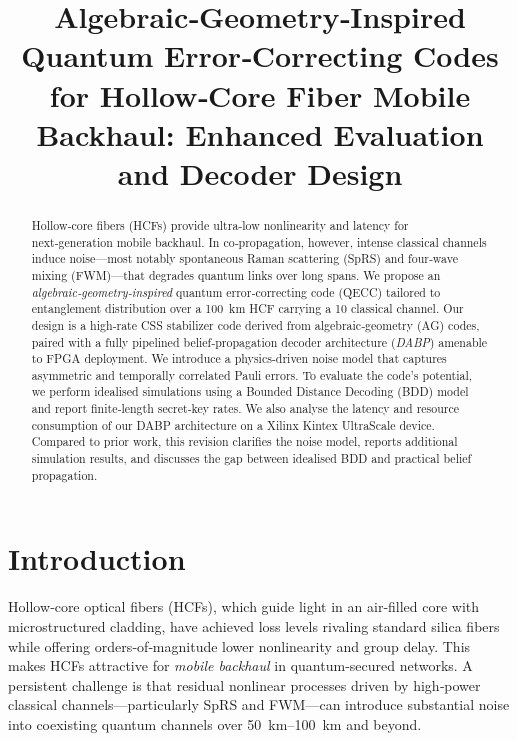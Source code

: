 \documentclass[conference]{IEEEtran}
\begin{document}
    \title{Algebraic‑Geometry‑Inspired Quantum Error‑Correcting Codes for Hollow‑Core Fiber Mobile Backhaul: Enhanced Evaluation and Decoder Design}

    \author{}

    \maketitle

    \begin{abstract}
    Hollow‑core fibers (HCFs) provide ultra‑low nonlinearity and latency for next‑generation mobile backhaul.  In 
co‑propagation, however, intense classical channels induce noise—most notably spontaneous Raman scattering (SpRS) and 
four‑wave mixing (FWM)—that degrades quantum links over long spans.  We propose an \emph{algebraic‑geometry‑inspired} 
quantum error‑correcting code (QECC) tailored to entanglement distribution over a \SI{100}{\kilo\meter} HCF carrying a 
\SI{10}{\dBm} classical channel.  Our design is a high‑rate CSS stabilizer code derived from algebraic‑geometry (AG) 
codes, paired with a fully pipelined belief‑propagation decoder architecture (\emph{DABP}) amenable to FPGA deployment.
  We introduce a physics‑driven noise model that captures asymmetric and temporally correlated Pauli errors.  To 
evaluate the code's potential, we perform idealised simulations using a Bounded Distance Decoding (BDD) model and report
 finite‑length secret‑key rates.  We also analyse the latency and resource consumption of our DABP architecture on a 
Xilinx Kintex UltraScale device.  Compared to prior work, this revision clarifies the noise model, reports additional 
simulation results, and discusses the gap between idealised BDD and practical belief propagation.
    \end{abstract}

    \section{Introduction}
    Hollow‑core optical fibers (HCFs), which guide light in an air‑filled core with microstructured cladding, have 
achieved loss levels rivaling standard silica fibers while offering orders‑of‑magnitude lower nonlinearity and group 
delay.  This makes HCFs attractive for \emph{mobile backhaul} in quantum‑secured networks.  A persistent challenge is 
that residual nonlinear processes driven by high‑power classical channels—particularly SpRS and FWM—can introduce 
substantial noise into coexisting quantum channels over \SIrange{50}{100}{\kilo\meter} and beyond.
\end{document}
